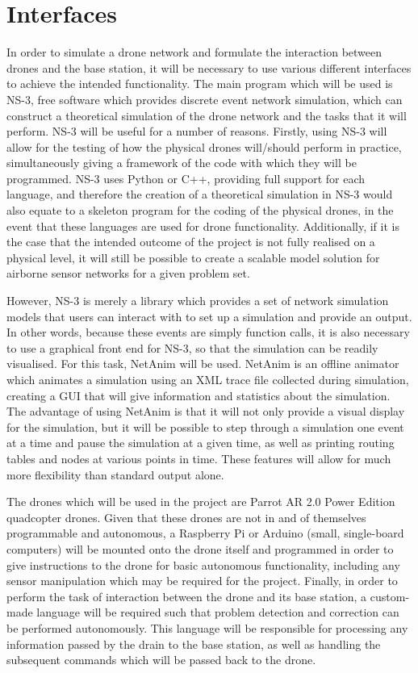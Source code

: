\documentclass[10pt,a4paper]{article}
\begin{document}
\section{Interfaces}
    In order to simulate a drone network and formulate the interaction between drones and the base station, it will be necessary to use various different interfaces to achieve the intended functionality. The main program which will be used is NS-3, free software which provides discrete event network simulation, which can construct a theoretical simulation of the drone network and the tasks that it will perform. NS-3 will be useful for a number of reasons. Firstly, using NS-3 will allow for the testing of how the physical drones will/should perform in practice, simultaneously giving a framework of the code with which they will be programmed. NS-3 uses Python or C++, providing full support for each language, and therefore the creation of a theoretical simulation in NS-3 would also equate to a skeleton program for the coding of the physical drones, in the event that these languages are used for drone functionality. Additionally, if it is the case that the intended outcome of the project is not fully realised on a physical level, it will still be possible to create a scalable model solution for airborne sensor networks for a given problem set.
    
    However, NS-3 is merely a library which provides a set of network simulation models that users can interact with to set up a simulation and provide an output. In other words, because these events are simply function calls, it is also necessary to use a graphical front end for NS-3, so that the simulation can be readily visualised. For this task, NetAnim will be used. NetAnim is an offline animator which animates a simulation using an XML trace file collected during simulation, creating a GUI that will give information and statistics about the simulation. The advantage of using NetAnim is that it will not only provide a visual display for the simulation, but it will be possible to step through a simulation one event at a time and pause the simulation at a given time, as well as printing routing tables and nodes at various points in time. These features will allow for much more flexibility than standard output alone.
    
    The drones which will be used in the project are Parrot AR 2.0 Power Edition quadcopter drones. Given that these drones are not in and of themselves programmable and autonomous, a Raspberry Pi or Arduino (small, single-board computers) will be mounted onto the drone itself and programmed in order to give instructions to the drone for basic autonomous functionality, including any sensor manipulation which may be required for the project. Finally, in order to perform the task of interaction between the drone and its base station, a custom-made language will be required such that problem detection and correction can be performed autonomously. This language will be responsible for processing any information passed by the drain to the base station, as well as handling the subsequent commands which will be passed back to the drone. 
\end{document}

